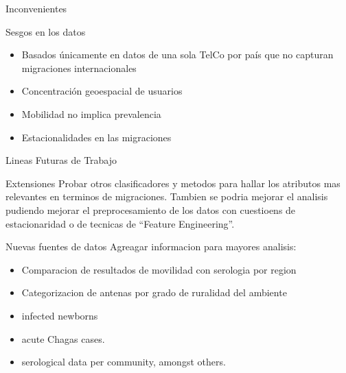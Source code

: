 \documentclass{beamer}
\begin{document}
\begin{frame}{Inconvenientes}

		\begin{block}{Sesgos en los datos}
			\begin{itemize}
			\item Basados únicamente en datos de una sola TelCo por país que no capturan migraciones internacionales 
			\item Concentración geoespacial de usuarios
			
			\item Mobilidad no implica prevalencia
			
			\item Estacionalidades en las migraciones

			\end{itemize}
 	 	\end{block}
\end{frame}



 \begin{frame}{Lineas Futuras de Trabajo}


	\begin{block}{Extensiones}
		Probar otros clasificadores y metodos para hallar los atributos mas relevantes en terminos de migraciones. Tambien se podria mejorar el analisis pudiendo mejorar el preprocesamiento de los datos con cuestioens de estacionaridad o de tecnicas de ``Feature Engineering''.
	\end{block}

	\medskip

	\begin{block}{Nuevas fuentes de datos}
		Agreagar informacion para mayores analisis:
		\begin{itemize}
			\item Comparacion de resultados de movilidad con serologia por region
			\item Categorizacion de antenas por grado de ruralidad del ambiente
			\item infected newborns
			\item acute Chagas cases.
			\item serological data per community, amongst others.
		\end{itemize}
	\end{block}


 \end{frame}
%
\end{document}
